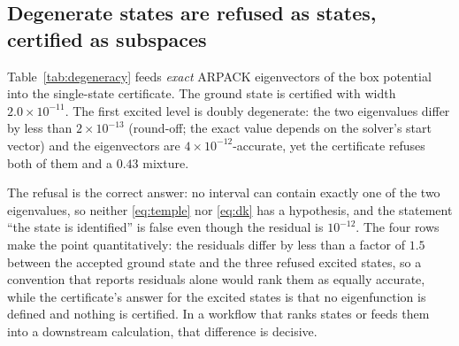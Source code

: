 \subsection{Degenerate states are refused as states, certified as subspaces}
\label{sec:deg-results}

Table~\ref{tab:degeneracy} feeds \emph{exact} ARPACK eigenvectors of the box
potential into the single-state certificate. The ground state is certified with
width $2.0\times10^{-11}$. The first excited level is doubly degenerate: the
two eigenvalues differ by less than $2\times10^{-13}$ (round-off; the exact
value depends on the solver's start vector) and the eigenvectors are
$4\times10^{-12}$-accurate, yet the certificate refuses both of them and a
$0.43$ mixture.

\begin{table}[t]
\centering
\small

\caption{Degeneracy experiment on the $81\times81$ box. The verified gap for
the refused states is $7.1\times10^{-9}$, below the resolution floor
$1.3\times10^{-5}$ of \eqref{eq:floor}.}
\label{tab:degeneracy}
\end{table}

The refusal is the correct answer: no interval can contain exactly one of the
two eigenvalues, so neither \eqref{eq:temple} nor \eqref{eq:dk} has a
hypothesis, and the statement ``the state is identified'' is false even though
the residual is $10^{-12}$. The four rows make the point quantitatively: the residuals differ by less than
a factor of $1.5$ between the accepted ground state and the three refused
excited states, so a convention that reports residuals alone would rank them
as equally accurate, while the certificate's answer for the excited states is
that no eigenfunction is defined and nothing is certified. In a workflow that
ranks states or feeds them into a downstream calculation, that difference is
decisive.

